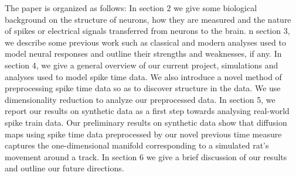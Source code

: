The  paper is organized as follows: In section 2 we give some biological background on the structure of neurons,
how they are measured and the nature of spikes or electrical signals transferred from neurons to the brain.
 n section 3, we describe some previous work such as classical and modern analyses used to model neural responses
and outline their strengths and weaknesses, if any. In section 4, we give a general overview of our current project,
simulations and analyses used to model spike time data.  We also introduce a novel method of preprocessing spike time data so as to discover structure in the data. We use dimensionality reduction to analyze our preprocessed data.  In section 5, we report our results on synthetic data as a first step towards analysing real-world spike train data. Our preliminary results on synthetic data show that diffusion maps using spike time data preprocessed by our novel previous time measure
 captures the  one-dimensional manifold corresponding to a simulated rat's movement around a track. In section 6 we give a brief discussion of our results and outline our future directions.
 
 
 
 
 
 
 
 
 
 
 
 
 
 
 
 
 
 
 
 
 
 
 



